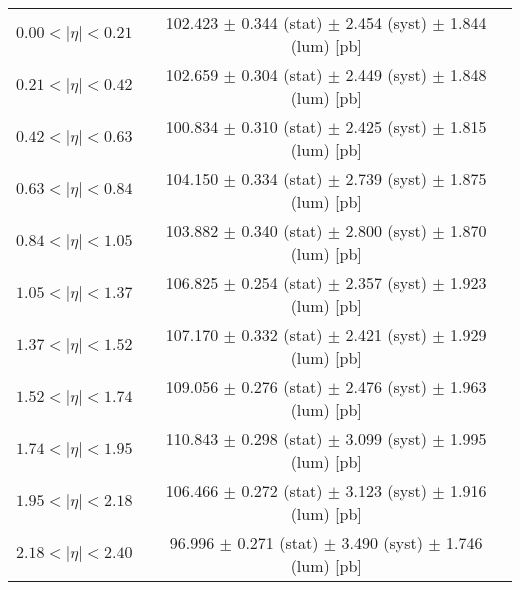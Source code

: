 \begin{tabular}{lc}
\hline
$0.00 < |\eta| <0.21$          & 102.423 $\pm$ 0.344 (stat) $\pm$ 2.454 (syst) $\pm$ 1.844 (lum) [pb]  \\
$0.21 < |\eta| <0.42$          & 102.659 $\pm$ 0.304 (stat) $\pm$ 2.449 (syst) $\pm$ 1.848 (lum) [pb]  \\
$0.42 < |\eta| <0.63$          & 100.834 $\pm$ 0.310 (stat) $\pm$ 2.425 (syst) $\pm$ 1.815 (lum) [pb]  \\
$0.63 < |\eta| <0.84$          & 104.150 $\pm$ 0.334 (stat) $\pm$ 2.739 (syst) $\pm$ 1.875 (lum) [pb]  \\
$0.84 < |\eta| <1.05$          & 103.882 $\pm$ 0.340 (stat) $\pm$ 2.800 (syst) $\pm$ 1.870 (lum) [pb]  \\
$1.05 < |\eta| <1.37$          & 106.825 $\pm$ 0.254 (stat) $\pm$ 2.357 (syst) $\pm$ 1.923 (lum) [pb]  \\
$1.37 < |\eta| <1.52$          & 107.170 $\pm$ 0.332 (stat) $\pm$ 2.421 (syst) $\pm$ 1.929 (lum) [pb]  \\
$1.52 < |\eta| <1.74$          & 109.056 $\pm$ 0.276 (stat) $\pm$ 2.476 (syst) $\pm$ 1.963 (lum) [pb]  \\
$1.74 < |\eta| <1.95$          & 110.843 $\pm$ 0.298 (stat) $\pm$ 3.099 (syst) $\pm$ 1.995 (lum) [pb]  \\
$1.95 < |\eta| <2.18$          & 106.466 $\pm$ 0.272 (stat) $\pm$ 3.123 (syst) $\pm$ 1.916 (lum) [pb]  \\
$2.18 < |\eta| <2.40$          & 96.996 $\pm$ 0.271 (stat) $\pm$ 3.490 (syst) $\pm$ 1.746 (lum) [pb]  \\
\hline
\end{tabular}

